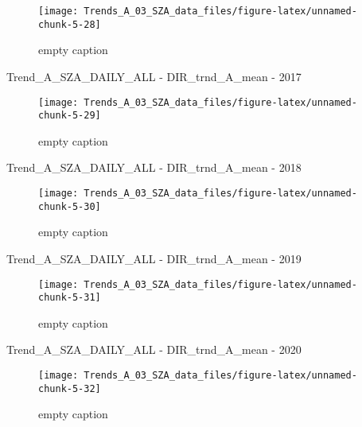 \documentclass[
  10pt,
  a4paper,oneside]{article}
\begin{document}
\begin{figure}[!ht]

{\centering \texttt{[image: Trends\_A\_03\_SZA\_data\_files/figure-latex/unnamed-chunk-5-28]} 

}

\caption{ empty caption }\label{fig:unnamed-chunk-5-28}
\end{figure}

Trend\_A\_SZA\_DAILY\_ALL - DIR\_trnd\_A\_mean - 2017

\begin{figure}[!ht]

{\centering \texttt{[image: Trends\_A\_03\_SZA\_data\_files/figure-latex/unnamed-chunk-5-29]} 

}

\caption{ empty caption }\label{fig:unnamed-chunk-5-29}
\end{figure}

Trend\_A\_SZA\_DAILY\_ALL - DIR\_trnd\_A\_mean - 2018

\begin{figure}[!ht]

{\centering \texttt{[image: Trends\_A\_03\_SZA\_data\_files/figure-latex/unnamed-chunk-5-30]} 

}

\caption{ empty caption }\label{fig:unnamed-chunk-5-30}
\end{figure}

Trend\_A\_SZA\_DAILY\_ALL - DIR\_trnd\_A\_mean - 2019

\begin{figure}[!ht]

{\centering \texttt{[image: Trends\_A\_03\_SZA\_data\_files/figure-latex/unnamed-chunk-5-31]} 

}

\caption{ empty caption }\label{fig:unnamed-chunk-5-31}
\end{figure}

Trend\_A\_SZA\_DAILY\_ALL - DIR\_trnd\_A\_mean - 2020

\begin{figure}[!ht]

{\centering \texttt{[image: Trends\_A\_03\_SZA\_data\_files/figure-latex/unnamed-chunk-5-32]} 

}

\caption{ empty caption }\label{fig:unnamed-chunk-5-32}
\end{figure}
\end{document}
